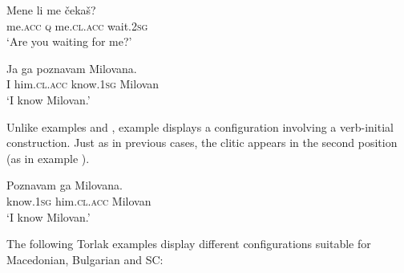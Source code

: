 \documentclass[output=paper,
colorlinks,
citecolor=brown,
newtxmath
]{langscibook}
\begin{document}

\ea\label{ex:29}
\gll Mene    li  me         čekaš?\\
     me.\textsc{acc}  \textsc{q}   me.\textsc{cl.acc}  wait.\textsc{2sg} \\
\glt `Are you waiting for me?'
\z


\ea\label{ex:30}
\gll Ja ga         poznavam Milovana.\\
     I  him.\textsc{cl.acc} know.\textsc{1sg}     Milovan \\
\glt `I know Milovan.'
\z

\noindent Unlike examples  and , example  displays a configuration involving a verb-initial construction. Just as in previous cases, the clitic appears in the second position (as in example ).



\ea\label{ex:31}
\gll Poznavam ga          Milovana.\\
     know.\textsc{1sg}    him.\textsc{cl.acc}  Milovan \\
\glt `I know Milovan.'
\z

\noindent The following Torlak examples display different configurations suitable for Macedonian, Bulgarian and SC:



\z


\z


\z


\z
\end{document}
